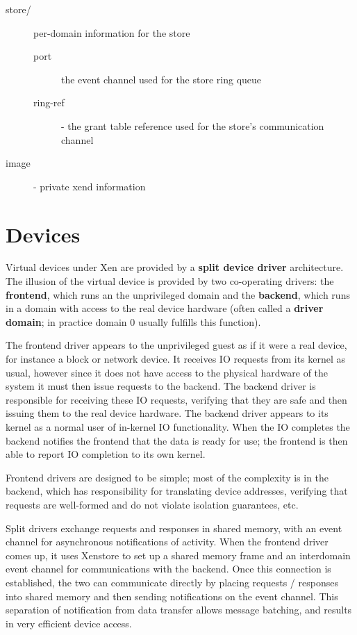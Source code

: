 \documentclass[11pt,twoside,final,openright]{report}
\begin{document}
\begin{description}
  \item[store/] per-domain information for the store
    \begin{description}
    \item[port] the event channel used for the store ring queue 
    \item[ring-ref] - the grant table reference used for the store's
      communication channel 
    \end{description}
    
  \item[image] - private xend information 
\end{description}


\chapter{Devices}
\label{c:devices}

Virtual devices under Xen are provided by a {\bf split device driver}
architecture.  The illusion of the virtual device is provided by two
co-operating drivers: the {\bf frontend}, which runs an the
unprivileged domain and the {\bf backend}, which runs in a domain with
access to the real device hardware (often called a {\bf driver
domain}; in practice domain 0 usually fulfills this function).

The frontend driver appears to the unprivileged guest as if it were a
real device, for instance a block or network device.  It receives IO
requests from its kernel as usual, however since it does not have
access to the physical hardware of the system it must then issue
requests to the backend.  The backend driver is responsible for
receiving these IO requests, verifying that they are safe and then
issuing them to the real device hardware.  The backend driver appears
to its kernel as a normal user of in-kernel IO functionality.  When
the IO completes the backend notifies the frontend that the data is
ready for use; the frontend is then able to report IO completion to
its own kernel.

Frontend drivers are designed to be simple; most of the complexity is
in the backend, which has responsibility for translating device
addresses, verifying that requests are well-formed and do not violate
isolation guarantees, etc.

Split drivers exchange requests and responses in shared memory, with
an event channel for asynchronous notifications of activity.  When the
frontend driver comes up, it uses Xenstore to set up a shared memory
frame and an interdomain event channel for communications with the
backend.  Once this connection is established, the two can communicate
directly by placing requests / responses into shared memory and then
sending notifications on the event channel.  This separation of
notification from data transfer allows message batching, and results
in very efficient device access.
\end{document}
